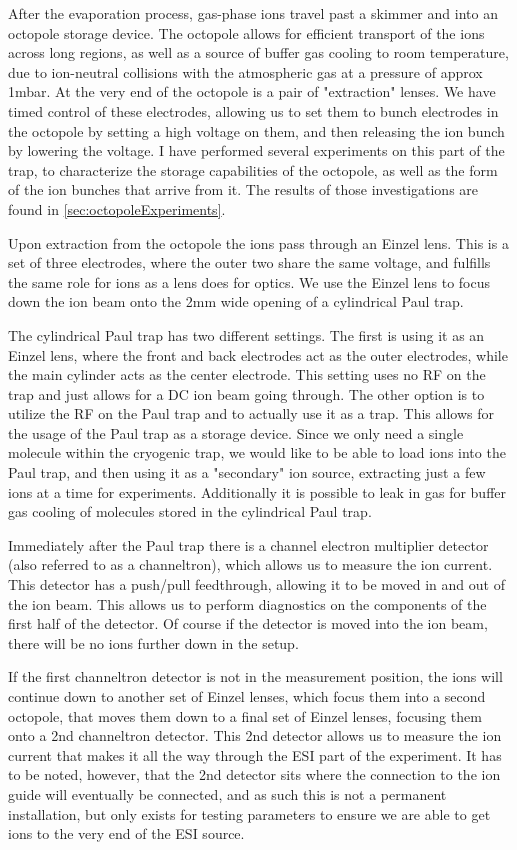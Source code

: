 After the evaporation process, gas-phase ions travel past a skimmer and into an octopole storage device. The octopole allows for efficient transport of the ions across long regions, as well as a source of buffer gas cooling to room temperature, due to ion-neutral collisions with the atmospheric gas at a pressure of approx 1mbar. At the very end of the octopole is a pair of "extraction" lenses. We have timed control of these electrodes, allowing us to set them to bunch electrodes in the octopole by setting a high voltage on them, and then releasing the ion bunch by lowering the voltage. I have performed several experiments on this part of the trap, to characterize the storage capabilities of the octopole, as well as the form of the ion bunches that arrive from it. The results of those investigations are found in \cref{sec:octopoleExperiments}.

Upon extraction from the octopole the ions pass through an Einzel lens. This is a set of three electrodes, where the outer two share the same voltage, and fulfills the same role for ions as a lens does for optics. We use the Einzel lens to focus down the ion beam onto the 2mm wide opening of a cylindrical Paul trap.

The cylindrical Paul trap has two different settings. The first is using it as an Einzel lens, where the front and back electrodes act as the outer electrodes, while the main cylinder acts as the center electrode. This setting uses no RF on the trap and just allows for a DC ion beam going through.
The other option is to utilize the RF on the Paul trap and to actually use it as a trap. This allows for the usage of the Paul trap as a storage device. Since we only need a single molecule within the cryogenic trap, we would like to be able to load ions into the Paul trap, and then using it as a "secondary" ion source, extracting just a few ions at a time for experiments.
Additionally it is possible to leak in gas for buffer gas cooling of molecules stored in the cylindrical Paul trap.

Immediately after the Paul trap there is a channel electron multiplier detector (also referred to as a channeltron), which allows us to measure the ion current. This detector has a push/pull feedthrough, allowing it to be moved in and out of the ion beam. This allows us to perform diagnostics on the components of the first half of the detector. Of course if the detector is moved into the ion beam, there will be no ions further down in the setup.

If the first channeltron detector is not in the measurement position, the ions will continue down to another set of Einzel lenses, which focus them into a second octopole, that moves them down to a final set of Einzel lenses, focusing them onto a 2nd channeltron detector. This 2nd detector allows us to measure the ion current that makes it all the way through the ESI part of the experiment.
It has to be noted, however, that the 2nd detector sits where the connection to the ion guide will eventually be connected, and as such this is not a permanent installation, but only exists for testing parameters to ensure we are able to get ions to the very end of the ESI source.
